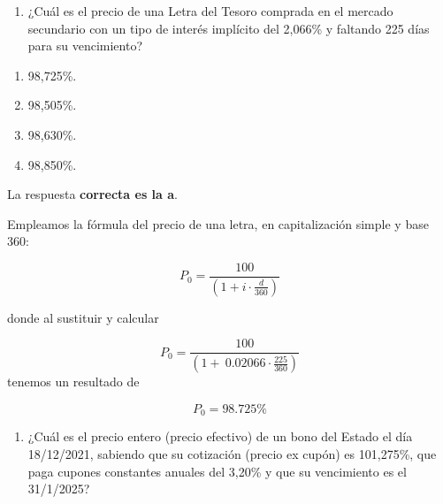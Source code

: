 \documentclass[
  letterpaper,
  DIV=11,
  numbers=noendperiod]{scrartcl}
\providecommand{\tightlist}{%
  \setlength{\itemsep}{0pt}\setlength{\parskip}{0pt}}\usepackage{longtable,booktabs,array}
\begin{document}
\begin{enumerate}
\def\labelenumi{\arabic{enumi}.}
\setcounter{enumi}{4}
\tightlist
\item
  ¿Cuál es el precio de una Letra del Tesoro comprada en el mercado
  secundario con un tipo de interés implícito del 2,066\% y faltando 225
  días para su vencimiento?
\end{enumerate}

\begin{enumerate}
\def\labelenumi{\alph{enumi}.}
\item
  98,725\%.
\item
  98,505\%.
\item
  98,630\%.
\item
  98,850\%.
\end{enumerate}

\begin{tcolorbox}[enhanced jigsaw, colframe=quarto-callout-note-color-frame, opacityback=0, colback=white, leftrule=.75mm, left=2mm, breakable, arc=.35mm, rightrule=.15mm, toprule=.15mm, bottomrule=.15mm]
\begin{minipage}[t]{5.5mm}
\textcolor{quarto-callout-note-color}{\faInfo}
\end{minipage}%
\begin{minipage}[t]{\textwidth - 5.5mm}

La respuesta \textbf{correcta es la a}.

Empleamos la fórmula del precio de una letra, en capitalización simple y
base 360:

\[P_0=\frac{100}{\left(1+i\cdot \frac{d}{360}\right)}\]

donde al sustituir y calcular

\[P_0=\frac{100}{\left(1+\:0.02066\cdot \frac{225}{360}\right)}\]
tenemos un resultado de

\[P_0=98.725\% \]

\end{minipage}%
\end{tcolorbox}

\begin{enumerate}
\def\labelenumi{\arabic{enumi}.}
\setcounter{enumi}{5}
\tightlist
\item
  ¿Cuál es el precio entero (precio efectivo) de un bono del Estado el
  día 18/12/2021, sabiendo que su cotización (precio ex cupón) es
  101,275\%, que paga cupones constantes anuales del 3,20\% y que su
  vencimiento es el 31/1/2025?
\end{enumerate}
\end{document}
